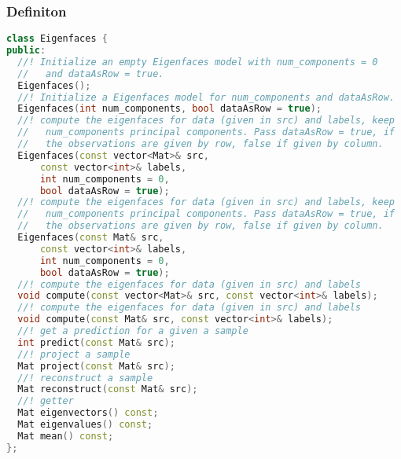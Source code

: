 \subsubsection{Definiton}
\begin{lstlisting}[language=c++]
class Eigenfaces {
public:
  //! Initialize an empty Eigenfaces model with num_components = 0 
  //   and dataAsRow = true.
  Eigenfaces();
  //! Initialize a Eigenfaces model for num_components and dataAsRow.
  Eigenfaces(int num_components, bool dataAsRow = true);
  //! compute the eigenfaces for data (given in src) and labels, keep 
  //   num_components principal components. Pass dataAsRow = true, if 
  //   the observations are given by row, false if given by column.
  Eigenfaces(const vector<Mat>& src, 
      const vector<int>& labels, 
      int num_components = 0, 
      bool dataAsRow = true);
  //! compute the eigenfaces for data (given in src) and labels, keep 
  //   num_components principal components. Pass dataAsRow = true, if 
  //   the observations are given by row, false if given by column.
  Eigenfaces(const Mat& src, 
      const vector<int>& labels, 
      int num_components = 0, 
      bool dataAsRow = true);
  //! compute the eigenfaces for data (given in src) and labels      
  void compute(const vector<Mat>& src, const vector<int>& labels);
  //! compute the eigenfaces for data (given in src) and labels
  void compute(const Mat& src, const vector<int>& labels);
  //! get a prediction for a given a sample
  int predict(const Mat& src);
  //! project a sample
  Mat project(const Mat& src);
  //! reconstruct a sample
  Mat reconstruct(const Mat& src);
  //! getter
  Mat eigenvectors() const;
  Mat eigenvalues() const;
  Mat mean() const;
};
\end{lstlisting}

